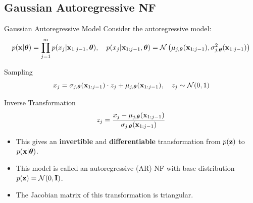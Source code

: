 \documentclass{beamer}
\begin{document}
\subsection{Gaussian Autoregressive NF}
\begin{frame}{Gaussian Autoregressive Model}
	Consider the autoregressive model:
	\vspace{-0.3cm}
	{\small
		\[
		p(\mathbf{x} | \boldsymbol{\theta}) = \prod_{j=1}^m p(x_j | \mathbf{x}_{1:j-1}, \boldsymbol{\theta}), \quad
		p(x_j | \mathbf{x}_{1:j-1}, \boldsymbol{\theta}) = \mathcal{N} \left(\mu_{j, \boldsymbol{\theta}}(\mathbf{x}_{1:j-1}), \sigma^2_{j, \boldsymbol{\theta}} (\mathbf{x}_{1:j-1})\right)
		\]
	}
	\vspace{-0.5cm}
	\begin{block}{Sampling}
		\vspace{-0.3cm}
		\[
		x_j = \sigma_{j, \boldsymbol{\theta}} (\mathbf{x}_{1:j-1}) \cdot z_j + \mu_{j, \boldsymbol{\theta}}(\mathbf{x}_{1:j-1}), \quad z_j \sim \mathcal{N}(0, 1)
		\]
		\vspace{-0.7cm}
	\end{block}
	\begin{block}{Inverse Transformation}
		\vspace{-0.5cm}
		\[
		z_j = \frac{x_j - \mu_{j, \boldsymbol{\theta}}(\mathbf{x}_{1:j-1})}{\sigma_{j, \boldsymbol{\theta}} (\mathbf{x}_{1:j-1}) }
		\]
		\vspace{-0.4cm}
	\end{block}
	\begin{itemize}
		\item This gives an \textbf{invertible} and \textbf{differentiable} transformation from $p(\mathbf{z})$ to $p(\mathbf{x} | \boldsymbol{\theta})$.
		\item This model is called an autoregressive (AR) NF with base distribution $p(\mathbf{z}) = \mathcal{N}(0, \mathbf{I})$.
		\item The Jacobian matrix of this transformation is triangular.
	\end{itemize}
\end{frame}
\end{document}
